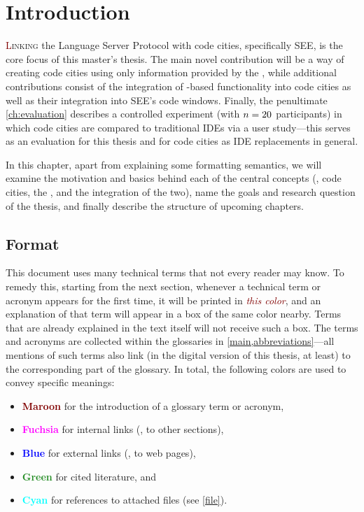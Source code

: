 \documentclass[../thesis]{subfiles}
\begin{document}
\chapter{Introduction}

\lettrine[lines=3]{\textcolor{Maroon}{L}}{inking} the Language Server Protocol with code cities, specifically SEE, is the core focus of this master's thesis.
The main novel contribution will be a way of creating code cities using only information provided by the , while additional contributions consist of the integration of -based functionality into code cities as well as their integration into SEE's code windows.
Finally, the penultimate \cref{ch:evaluation} describes a controlled experiment (with $n=20$ participants) in which code cities are compared to traditional IDEs via a user study---this serves as an evaluation for this thesis and for code cities as IDE replacements in general.

In this chapter, apart from explaining some formatting semantics, we will examine the motivation and basics behind each of the central concepts (\ie, code cities, the , and the integration of the two), name the goals and research question of the thesis, and finally describe the structure of upcoming chapters.

\section{Format}

This document uses many technical terms that not every reader may know.
To remedy this, starting from the next section, whenever a technical term or acronym appears for the first time, it will be printed in \emph{\textcolor{Maroon}{this color}}, and an explanation of that term will appear in a box of the same color nearby.
Terms that are already explained in the text itself will not receive such a box.
The terms and acronyms are collected within the glossaries in \cref{main,abbreviations}---all mentions of such terms also link (in the digital version of this thesis, at least) to the corresponding part of the glossary.
In total, the following colors are used to convey specific meanings:
\begin{itemize}
	\item \textbf{\textcolor{Maroon}{Maroon}} for the introduction of a glossary term or acronym,
	\item \textbf{\textcolor{Fuchsia}{Fuchsia}} for internal links (\eg, to other sections),
	\item \textbf{\textcolor{Blue}{Blue}} for external links (\eg, to web pages),
	\item \textbf{\textcolor{ForestGreen}{Green}} for cited literature, and
	\item \textbf{\textcolor{Cyan}{Cyan}} for references to attached files (see \cref{file}).
\end{itemize}
\end{document}
